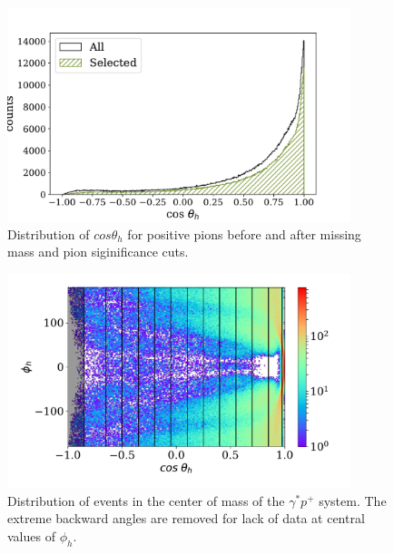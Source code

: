 \begin{figure}
  \begin{center}
    \includegraphics[width=10cm]{image/cos_theta_h.pdf}
    \caption{Distribution of $cos \theta_h$ for positive pions before and after missing mass and pion siginificance cuts.}
  \end{center}
\end{figure}


\begin{figure}
  \begin{center}
    \includegraphics[width=10cm]{image/cos_theta_h_phi_h_binned.pdf}
    \caption{Distribution of events in the center of mass of the $\gamma^* p^+$ system.  The extreme backward angles are removed for lack of data at central values of $\phi_h$.}
  \end{center}
\end{figure}

